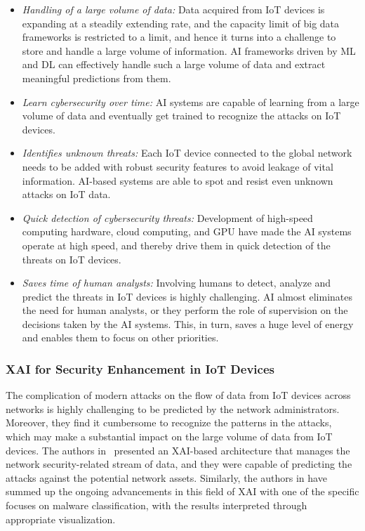 \documentclass[journal]{IEEEtran}
\begin{document}
\begin{itemize}
    \item \textit{Handling of a large volume of data:} Data acquired from IoT devices is expanding at a steadily extending rate, and the capacity limit of big data frameworks is restricted to a limit, and hence it turns into a challenge to store and handle a large volume of information. AI frameworks driven by ML and DL can effectively handle such a large volume of data and extract meaningful predictions from them.
   
    \item \textit{Learn cybersecurity over time:} AI systems are capable of learning from a large volume of data and eventually get trained to recognize the attacks on IoT devices.
   
    \item \textit{Identifies unknown threats:} Each IoT device connected to the global network needs to be added with robust security features to avoid leakage of vital information. AI-based systems are able to spot and resist even unknown attacks on IoT data. 
    
    \item \textit{Quick detection of cybersecurity threats:} Development of high-speed computing hardware, cloud computing, and GPU have made the AI systems operate at high speed, and thereby drive them in quick detection of the threats on IoT devices.
   
    \item \textit{Saves time of human analysts:} Involving humans to detect, analyze and predict the threats in IoT devices is highly challenging. AI almost eliminates the need for human analysts, or they perform the role of supervision on the decisions taken by the AI systems. This, in turn, saves a huge level of energy and enables them to focus on other priorities. 
\end{itemize}

\subsubsection{XAI for Security Enhancement in IoT Devices}

The complication of modern attacks on the flow of data from IoT devices across networks is highly challenging to be predicted by the network administrators. Moreover, they find it cumbersome to recognize the patterns in the attacks, which may make a substantial impact on the large volume of data from IoT devices. The authors in~\cite{miloslavskaya2020stream} presented an XAI-based architecture that manages the network security-related stream of data, and they were capable of predicting the attacks against the potential network assets. Similarly, the authors in \cite{mathews2019explainable} have summed up the ongoing advancements in this field of XAI with one of the specific focuses on malware classification, with the results interpreted through appropriate visualization.
\end{document}
